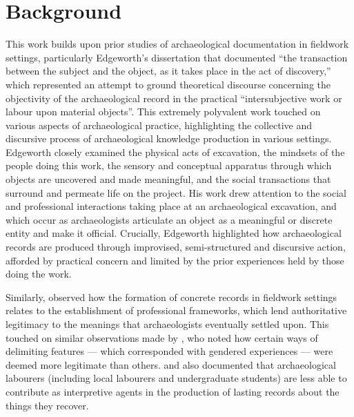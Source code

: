 \documentclass{article}
\begin{document}
\section{Background}
This work builds upon prior studies of archaeological documentation in
fieldwork settings, particularly Edgeworth's
\parencite*[28]{edgeworth1991} dissertation that documented ``the
transaction between the subject and the object, as it takes place in the
act of discovery,'' which represented an attempt to ground theoretical
discourse concerning the objectivity of the archaeological record in the
practical ``intersubjective work or labour upon material objects''. This
extremely polyvalent work touched on various aspects of archaeological
practice, highlighting the collective and discursive process of
archaeological knowledge production in various settings. Edgeworth
closely examined the physical acts of excavation, the mindsets of the
people doing this work, the sensory and conceptual apparatus through
which objects are uncovered and made meaningful, and the social
transactions that surround and permeate life on the project. His work
drew attention to the social and professional interactions taking place
at an archaeological excavation, and which occur as archaeologists
articulate an object as a meaningful or discrete entity and make it
official. Crucially, Edgeworth highlighted how archaeological records
are produced through improvised, semi-structured and discursive action,
afforded by practical concern and limited by the prior experiences held
by those doing the work.

Similarly, \textcites{goodwin1994}{goodwin2010} observed how the
formation of concrete records in fieldwork settings relates to the
establishment of professional frameworks, which lend authoritative
legitimacy to the meanings that archaeologists eventually settled upon.
This touched on similar observations made by \textcite{gero1996}, who
noted how certain ways of delimiting features --- which corresponded
with gendered experiences --- were deemed more legitimate than others.
\textcite{mickel2021} and \textcite{yarrow2008} also documented that
archaeological labourers (including local labourers and undergraduate
students) are less able to contribute as interpretive agents in the
production of lasting records about the things they recover.
\end{document}
